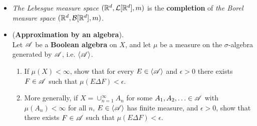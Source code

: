 \documentclass[11pt]{article}
\begin{document}
\begin{itemize}
\item \begin{remark}
\emph{The Lebesgue measure space} $({\mathbb R}^d, {\mathcal L}[{\mathbb R}^d], m)$ is the \textbf{completion} of \emph{the Borel measure space} $({\mathbb R}^d, {\mathcal B}[{\mathbb R}^d], m)$.
\end{remark}

\item \begin{exercise} (\textbf{Approximation by an algebra}). \\
Let ${\mathscr A}$ be a \textbf{Boolean algebra} on $X$, and let $\mu$ be a measure on the $\sigma$-algebra generated by ${\mathscr A}$, i.e. $\langle {\mathscr A} \rangle$.
\begin{enumerate}
\item If $\mu(X) < \infty$, show that for every $E \in \langle {\mathscr A} \rangle$ and $\epsilon > 0$ there exists $F \in {\mathscr A}$ such that $\mu(E \Delta F) < \epsilon$.
\item More generally, if $X = \cup_{n=1}^{\infty} A_n$ for some $A_1, A_2, \ldots \in {\mathscr A}$ with $\mu(A_n) < \infty$ for all $n$, $E \in \langle {\mathscr A} \rangle$ has finite measure, and $\epsilon > 0$, show that there exists $F \in {\mathscr A}$ such that $\mu(E \Delta F) < \epsilon$.
\end{enumerate}
\end{exercise}
\end{itemize}
\end{document}
